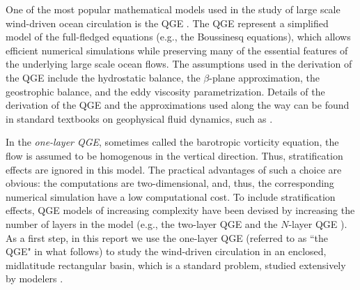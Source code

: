 One of the most popular mathematical models used in the study of large scale
wind-driven ocean circulation is the QGE \cite{Cushman11,Vallis06}. The QGE
represent a simplified model of the full-fledged equations (e.g., the Boussinesq
equations), which allows efficient numerical simulations while preserving many
of the essential features of the underlying large scale ocean flows. The
assumptions used in the derivation of the QGE include the hydrostatic balance,
the $\beta$-plane approximation, the geostrophic balance, and the eddy viscosity
parametrization.  Details of the derivation of the QGE and the approximations
used along the way can be found in standard textbooks on geophysical fluid
dynamics, such as
\cite{Cushman11,Majda,Majda03,McWilliams06,Pedlosky92,Vallis06}.

In the \emph{one-layer QGE}, sometimes called the barotropic vorticity equation,
the flow is assumed to be homogenous in the vertical direction. Thus,
stratification effects are ignored in this model.  The practical advantages of
such a choice are obvious: the computations are two-dimensional, and, thus, the
corresponding numerical simulation have a low computational cost. To include
stratification effects, QGE models of increasing complexity have been devised by
increasing the number of layers in the model (e.g., the two-layer QGE and the
$N$-layer QGE \cite{Vallis06}). As a first step, in this report we use the
one-layer QGE (referred to as ``the QGE" in what follows) to study the
wind-driven circulation in an enclosed, midlatitude rectangular basin, which is
a standard problem, studied extensively by modelers \cite{Cushman11, Layton08,
Majda03, Majda, McWilliams06, Vallis06, Pedlosky92}.

